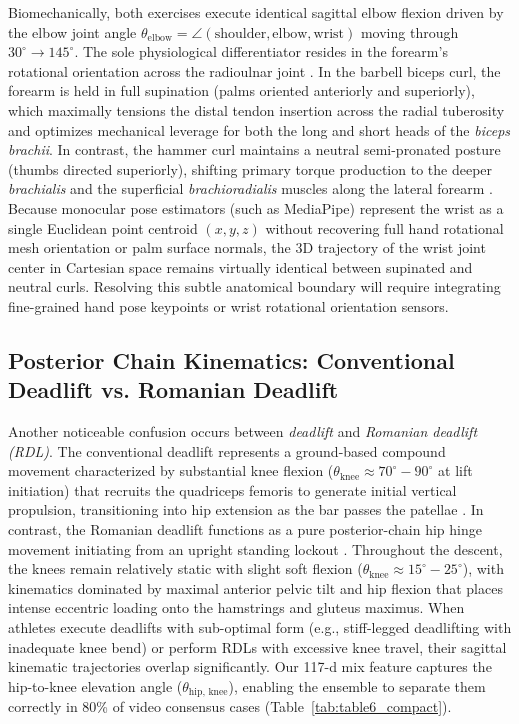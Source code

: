 \documentclass[preprint,12pt]{elsarticle}
\begin{document}
Biomechanically, both exercises execute identical sagittal elbow flexion driven by the elbow joint angle $\theta_{\text{elbow}} = \angle(\text{shoulder}, \text{elbow}, \text{wrist})$ moving through $30^\circ \to 145^\circ$. The sole physiological differentiator resides in the forearm's rotational orientation across the radioulnar joint \cite{oliveira2009,marcolin2018}. In the barbell biceps curl, the forearm is held in full supination (palms oriented anteriorly and superiorly), which maximally tensions the distal tendon insertion across the radial tuberosity and optimizes mechanical leverage for both the long and short heads of the \textit{biceps brachii}. In contrast, the hammer curl maintains a neutral semi-pronated posture (thumbs directed superiorly), shifting primary torque production to the deeper \textit{brachialis} and the superficial \textit{brachioradialis} muscles along the lateral forearm \cite{oliveira2009,marcolin2018}. Because monocular pose estimators (such as MediaPipe) represent the wrist as a single Euclidean point centroid $(x, y, z)$ without recovering full hand rotational mesh orientation or palm surface normals, the 3D trajectory of the wrist joint center in Cartesian space remains virtually identical between supinated and neutral curls. Resolving this subtle anatomical boundary will require integrating fine-grained hand pose keypoints or wrist rotational orientation sensors.

\subsection{Posterior Chain Kinematics: Conventional Deadlift vs. Romanian Deadlift}
Another noticeable confusion occurs between \textit{deadlift} and \textit{Romanian deadlift (RDL)}. The conventional deadlift represents a ground-based compound movement characterized by substantial knee flexion ($\theta_{\text{knee}} \approx 70^\circ-90^\circ$ at lift initiation) that recruits the quadriceps femoris to generate initial vertical propulsion, transitioning into hip extension as the bar passes the patellae \cite{escamilla2000}. In contrast, the Romanian deadlift functions as a pure posterior-chain hip hinge movement initiating from an upright standing lockout \cite{mcallister2014,schoenfeld2010}. Throughout the descent, the knees remain relatively static with slight soft flexion ($\theta_{\text{knee}} \approx 15^\circ-25^\circ$), with kinematics dominated by maximal anterior pelvic tilt and hip flexion that places intense eccentric loading onto the hamstrings and gluteus maximus. When athletes execute deadlifts with sub-optimal form (e.g., stiff-legged deadlifting with inadequate knee bend) or perform RDLs with excessive knee travel, their sagittal kinematic trajectories overlap significantly. Our 117-d mix feature captures the hip-to-knee elevation angle ($\theta_{\text{hip, knee}}$), enabling the ensemble to separate them correctly in 80\% of video consensus cases (Table~\ref{tab:table6_compact}).
\end{document}
